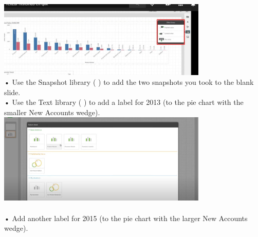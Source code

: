 \documentclass[preprint,12pt]{elsarticle}
\begin{document}
\begin{itemize}
					\includegraphics[width=10cm]{./IMAGENES/9}
				\\ • Use the Snapshot library ( ) to add the two snapshots you took to the blank slide.
				\\ • Use the Text library ( ) to add a label for 2013 (to the pie chart with the smaller New Accounts
				wedge).  \\
					\includegraphics[width=10cm]{./IMAGENES/9.1}  \\
				\\ • Add another label for 2015 (to the pie chart with the larger New Accounts wedge).
				

\end{itemize}
\end{document}
